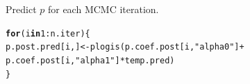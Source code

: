 \documentclass[color=usenames,dvipsnames]{beamer}\usepackage[]{graphicx}\usepackage[]{xcolor}
\makeatletter
\newcommand{\hlnum}[1]{\textcolor[rgb]{0.69,0.494,0}{#1}}%
\newcommand{\hlsng}[1]{\textcolor[rgb]{0.749,0.012,0.012}{#1}}%
\newcommand{\hlopt}[1]{\textcolor[rgb]{0,0,0}{#1}}%
\newcommand{\hldef}[1]{\textcolor[rgb]{0,0,0}{#1}}%
\newcommand{\hlkwa}[1]{\textcolor[rgb]{0,0,0}{\textbf{#1}}}%
\newcommand{\hlkwb}[1]{\textcolor[rgb]{0,0.341,0.682}{#1}}%
\newcommand{\hlkwd}[1]{\textcolor[rgb]{0.004,0.004,0.506}{#1}}%
\newenvironment{kframe}{%
 \def\at@end@of@kframe{}%
 \ifinner\ifhmode%
  \def\at@end@of@kframe{\end{minipage}}%
  \begin{minipage}{\columnwidth}%
 \fi\fi%
 \def\FrameCommand##1{\hskip\@totalleftmargin \hskip-\fboxsep
 \colorbox{shadecolor}{##1}\hskip-\fboxsep
     \hskip-\linewidth \hskip-\@totalleftmargin \hskip\columnwidth}%
 \MakeFramed {\advance\hsize-\width
   \@totalleftmargin\z@ \linewidth\hsize
   \@setminipage}}%
 {\par\unskip\endMakeFramed%
 \at@end@of@kframe}
\newenvironment{knitrout}{}{} %
\newcommand{\inr}[1]{\colorbox{inlinecolor}{\texttt{#1}}}
\makeatother
\begin{document}
\begin{frame}[fragile]
\begin{knitrout}
\begin{kframe}
{\ttfamily\noindent\bfseries\color{errorcolor}{\#\# Error: object 'n.iter' not found}}\end{kframe}
\end{knitrout}
  \pause
  \vfill
  Predict $p$ for each MCMC iteration.
  \vspace{-6pt}
\begin{knitrout}\scriptsize
{}\color{fgcolor}\begin{kframe}
\begin{alltt}
\hlkwa{for}\hldef{(i} \hlkwa{in} \hlnum{1}\hlopt{:}\hldef{n.iter) \{}
    \hldef{p.post.pred[i,]} \hlkwb{<-} \hlkwd{plogis}\hldef{(p.coef.post[i,}\hlsng{"alpha0"}\hldef{]} \hlopt{+}
                              \hldef{p.coef.post[i,}\hlsng{"alpha1"}\hldef{]}\hlopt{*}\hldef{temp.pred)}
\hldef{\}}
\end{alltt}


{\ttfamily\noindent\bfseries\color{errorcolor}{\#\# Error: object 'n.iter' not found}}\end{kframe}
\end{knitrout}
\end{frame}
\end{document}
